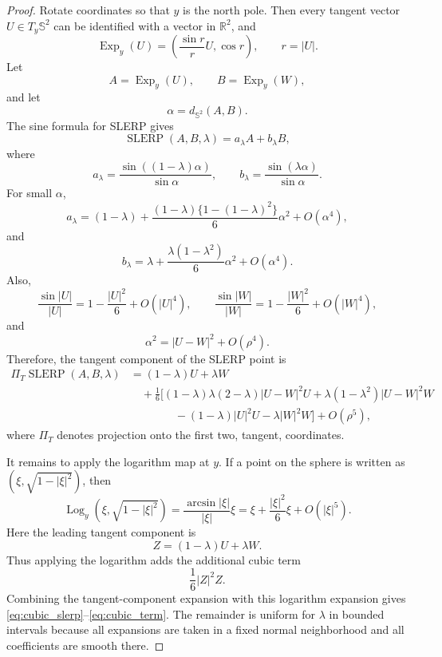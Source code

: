 \documentclass[a4paper,11pt]{article}
\newcommand{\bS}{\mathbb{S}}
\newcommand{\bR}{\mathbb{R}}
\newcommand{\Log}{\operatorname{Log}}
\newcommand{\Exp}{\operatorname{Exp}}
\newcommand{\SLERP}{\operatorname{SLERP}}
\numberwithin{equation}{section}
\begin{document}
\begin{proof}
Rotate coordinates so that \(y\) is the north pole.  Then every tangent vector
\(U\in T_y\bS^2\) can be identified with a vector in \(\bR^2\), and
\[
        \Exp_y(U)
        =
        \left(\frac{\sin r}{r}U,\cos r\right),
        \qquad r=|U|.
\]
Let
\[
        A=\Exp_y(U),\qquad B=\Exp_y(W),
\]
and let
\[
        \alpha=d_{\bS^2}(A,B).
\]
The sine formula for SLERP gives
\[
        \SLERP(A,B,\lambda)
        =
        a_\lambda A+b_\lambda B,
\]
where
\[
        a_\lambda=\frac{\sin((1-\lambda)\alpha)}{\sin\alpha},
        \qquad
        b_\lambda=\frac{\sin(\lambda\alpha)}{\sin\alpha}.
\]
For small \(\alpha\),
\[
        a_\lambda
        =
        (1-\lambda)
        +
        \frac{(1-\lambda)\{1-(1-\lambda)^2\}}{6}\alpha^2
        +O(\alpha^4),
\]
and
\[
        b_\lambda
        =
        \lambda
        +
        \frac{\lambda(1-\lambda^2)}{6}\alpha^2
        +O(\alpha^4).
\]
Also,
\[
        \frac{\sin |U|}{|U|}
        =
        1-\frac{|U|^2}{6}+O(|U|^4),
        \qquad
        \frac{\sin |W|}{|W|}
        =
        1-\frac{|W|^2}{6}+O(|W|^4),
\]
and
\[
        \alpha^2=|U-W|^2+O(\rho^4).
\]
Therefore, the tangent component of the SLERP point is
\[
\begin{aligned}
        \Pi_T \SLERP(A,B,\lambda)
        &=
        (1-\lambda)U+\lambda W                                      \\
        &\quad
        +\frac{1}{6}
        \Big[
        (1-\lambda)\lambda(2-\lambda)|U-W|^2U
        +\lambda(1-\lambda^2)|U-W|^2W                                \\
        &\qquad\qquad
        -(1-\lambda)|U|^2U-\lambda |W|^2W
        \Big]
        +O(\rho^5),
\end{aligned}
\]
where \(\Pi_T\) denotes projection onto the first two, tangent, coordinates.

It remains to apply the logarithm map at \(y\).  If a point on the sphere is
written as \((\xi,\sqrt{1-|\xi|^2})\), then
\[
        \Log_y(\xi,\sqrt{1-|\xi|^2})
        =
        \frac{\arcsin|\xi|}{|\xi|}\xi
        =
        \xi+\frac{|\xi|^2}{6}\xi+O(|\xi|^5).
\]
Here the leading tangent component is
\[
        Z=(1-\lambda)U+\lambda W.
\]
Thus applying the logarithm adds the additional cubic term
\[
        \frac{1}{6}|Z|^2Z.
\]
Combining the tangent-component expansion with this logarithm expansion gives
\eqref{eq:cubic_slerp}--\eqref{eq:cubic_term}.  The remainder is uniform for
\(\lambda\) in bounded intervals because all expansions are taken in a fixed
normal neighborhood and all coefficients are smooth there.
\end{proof}
\end{document}

